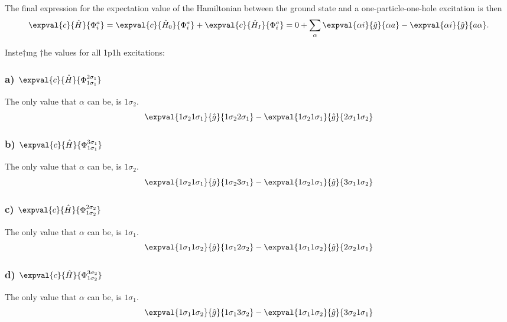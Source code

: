 The final expression for the expectation value of the Hamiltonian between the ground state and a one-particle-one-hole excitation is then
\begin{equation*}
    \expval{c}{\hat{H}}{\Phi_i^a} = \expval{c}{\hat{H}_0}{\Phi_i^a} + \expval{c}{\hat{H}_I}{\Phi_i^a} = 0 + \sum_{\alpha} \expval{\alpha i}{\hat{g}}{\alpha a} - \expval{\alpha i}{\hat{g}}{a \alpha}.
\end{equation*}

Inste†ıng †he values for all 1p1h excitations:

\subsubsection*{a) $\expval{c}{\hat{H}}{\Phi_{1\sigma_1}^{2\sigma_1}}$} %
The only value that $\alpha$ can be, is $1\sigma_2$.
\begin{equation*}
    \expval{1\sigma_2 1\sigma_1}{\hat{g}}{1\sigma_2 2\sigma_1} - \expval{1\sigma_2 1\sigma_1}{\hat{g}}{2\sigma_1 1\sigma_2}
\end{equation*}

\subsubsection*{b) $\expval{c}{\hat{H}}{\Phi_{1\sigma_1}^{3\sigma_1}}$} %
The only value that $\alpha$ can be, is $1\sigma_2$.
\begin{equation*}
    \expval{1\sigma_2 1\sigma_1}{\hat{g}}{1\sigma_2 3\sigma_1} - \expval{1\sigma_2 1\sigma_1}{\hat{g}}{3\sigma_1 1\sigma_2}
\end{equation*}

\subsubsection*{c) $\expval{c}{\hat{H}}{\Phi_{1\sigma_2}^{2\sigma_2}}$} %
The only value that $\alpha$ can be, is $1\sigma_1$.
\begin{equation*}
    \expval{1\sigma_1 1\sigma_2}{\hat{g}}{1\sigma_1 2\sigma_2} - \expval{1\sigma_1 1\sigma_2}{\hat{g}}{2\sigma_2 1\sigma_1}
\end{equation*}

\subsubsection*{d) $\expval{c}{\hat{H}}{\Phi_{1\sigma_2}^{3\sigma_2}}$} %
The only value that $\alpha$ can be, is $1\sigma_1$.
\begin{equation*}
    \expval{1\sigma_1 1\sigma_2}{\hat{g}}{1\sigma_1 3\sigma_2} - \expval{1\sigma_1 1\sigma_2}{\hat{g}}{3\sigma_2 1\sigma_1}
\end{equation*}

